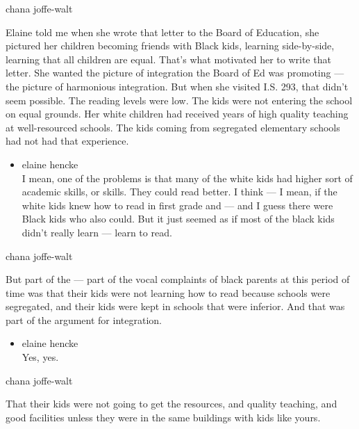 chana joffe-walt

Elaine told me when she wrote that letter to the Board of Education, she
pictured her children becoming friends with Black kids, learning
side-by-side, learning that all children are equal. That's what
motivated her to write that letter. She wanted the picture of
integration the Board of Ed was promoting --- the picture of harmonious
integration. But when she visited I.S. 293, that didn't seem possible.
The reading levels were low. The kids were not entering the school on
equal grounds. Her white children had received years of high quality
teaching at well-resourced schools. The kids coming from segregated
elementary schools had not had that experience.

\begin{itemize}
\tightlist
\item
  elaine hencke\\
  I mean, one of the problems is that many of the white kids had higher
  sort of academic skills, or skills. They could read better. I think
  --- I mean, if the white kids knew how to read in first grade and ---
  and I guess there were Black kids who also could. But it just seemed
  as if most of the black kids didn't really learn --- learn to read.
\end{itemize}

chana joffe-walt

But part of the --- part of the vocal complaints of black parents at
this period of time was that their kids were not learning how to read
because schools were segregated, and their kids were kept in schools
that were inferior. And that was part of the argument for integration.

\begin{itemize}
\tightlist
\item
  elaine hencke\\
  Yes, yes.
\end{itemize}

chana joffe-walt

That their kids were not going to get the resources, and quality
teaching, and good facilities unless they were in the same buildings
with kids like yours.

